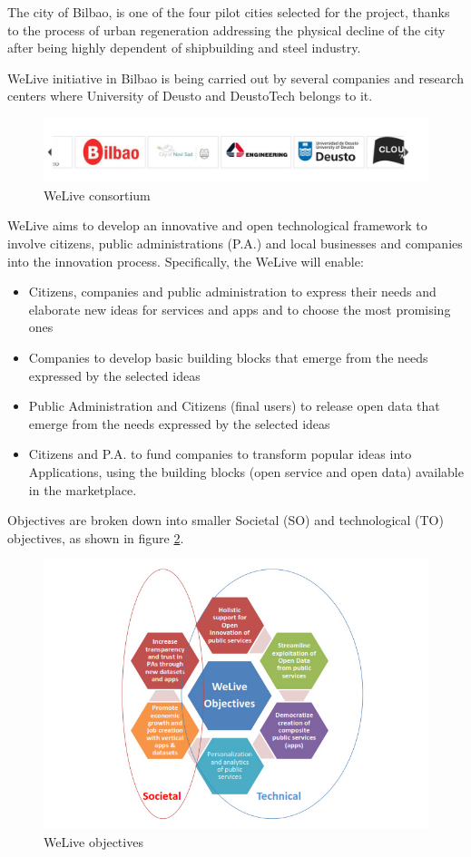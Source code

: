 \documentclass{DeustoFDP}
\begin{document}
The city of Bilbao, is one of the four pilot cities selected for the project, thanks to the process of urban regeneration addressing the physical decline of the city after being highly dependent of shipbuilding and steel industry.

WeLive initiative in Bilbao is being carried out by several companies and research centers where University of Deusto and DeustoTech belongs to it.

\begin{figure}[h!]
\centering
\includegraphics[width=0.9\linewidth]{fig/weliveconsortium}
\caption[WeLive consortium]{WeLive consortium}
\label{fig:weliveconsortium}
\end{figure}


WeLive aims to develop an innovative and open technological framework to involve citizens, public administrations (P.A.) and local businesses and companies into the innovation process. Specifically, the WeLive will enable:
\begin{itemize}
	\item Citizens, companies and public administration to express their needs and elaborate new ideas for services and apps and to choose the most promising ones
	\item Companies to develop basic building blocks that emerge from the needs expressed by the selected ideas
	\item Public Administration and Citizens (final users) to release open data that emerge from the needs expressed by the selected ideas
	\item Citizens and P.A. to fund companies to transform popular ideas into Applications, using the building blocks (open service and open data) available in the marketplace.
\end{itemize}

Objectives are broken down into smaller Societal (SO) and technological (TO) objectives, as shown in figure \ref{fig:welive3}.
\begin{figure}[h!]
\centering
\includegraphics[width=0.7\linewidth]{fig/welive3}
\caption[WeLive objectives]{WeLive objectives}
\label{fig:welive3}
\end{figure}
\end{document}
